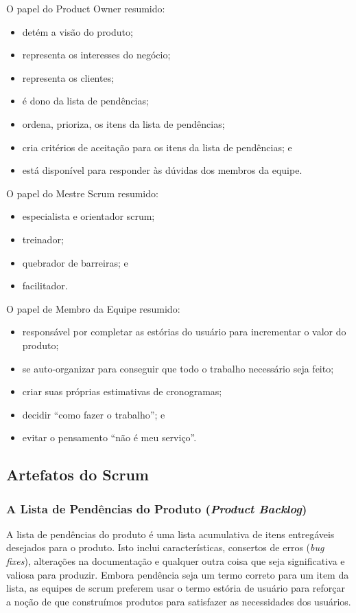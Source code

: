\documentclass[
	11pt,				%
	openright,
	twoside,			%
	a4paper,			%
	english,			%
	french,
	brazil,				%
	sumario=tradicional
	]{abntex2}
\begin{document}
O papel do Product Owner resumido:
\begin{itemize}
\item detém a visão do produto;
\item representa os interesses do negócio;
\item representa os clientes;
\item é dono da lista de pendências;
\item ordena, prioriza, os itens da lista de pendências;
\item cria critérios de aceitação para os itens da lista de pendências; e
\item está disponível para responder às dúvidas dos membros da equipe.
\end{itemize}

O papel do Mestre Scrum resumido:
\begin{itemize}
\item especialista e orientador scrum;
\item treinador;
\item quebrador de barreiras; e
\item facilitador.
\end{itemize}

O papel de Membro da Equipe resumido:
\begin{itemize}
\item responsável por completar as estórias do usuário para incrementar o valor do produto;
\item se auto-organizar para conseguir que todo o trabalho necessário seja feito;
\item criar suas próprias estimativas de cronogramas;
\item decidir ``como fazer o trabalho''; e
\item evitar o pensamento ``não é meu serviço''.
\end{itemize}

\subsection{Artefatos do Scrum}
\subsubsection{A Lista de Pendências do Produto (\emph{Product Backlog})}
A lista de pendências do produto é uma lista acumulativa de itens entregáveis desejados para o produto. Isto inclui características, consertos de erros (\emph{bug fixes}), alterações na documentação e qualquer outra coisa que seja significativa e valiosa para produzir. Embora pendência seja um termo correto para um item da lista, as equipes de scrum preferem usar o termo estória de usuário para reforçar a noção de que construímos produtos para satisfazer as necessidades dos usuários.
\end{document}
